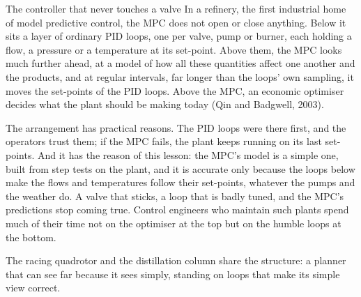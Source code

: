 \begin{curiosity}{The controller that never touches a valve}
In a refinery, the first industrial home of model predictive control, the MPC does not open or close anything. Below it sits a layer of ordinary PID loops, one per valve, pump or burner, each holding a flow, a pressure or a temperature at its set-point. Above them, the MPC looks much further ahead, at a model of how all these quantities affect one another and the products, and at regular intervals, far longer than the loops' own sampling, it moves the set-points of the PID loops. Above the MPC, an economic optimiser decides what the plant should be making today (Qin and Badgwell, 2003).

The arrangement has practical reasons. The PID loops were there first, and the operators trust them; if the MPC fails, the plant keeps running on its last set-points. And it has the reason of this lesson: the MPC's model is a simple one, built from step tests on the plant, and it is accurate only because the loops below make the flows and temperatures follow their set-points, whatever the pumps and the weather do. A valve that sticks, a loop that is badly tuned, and the MPC's predictions stop coming true. Control engineers who maintain such plants spend much of their time not on the optimiser at the top but on the humble loops at the bottom.

The racing quadrotor and the distillation column share the structure: a planner that can see far because it sees simply, standing on loops that make its simple view correct.
\end{curiosity}

